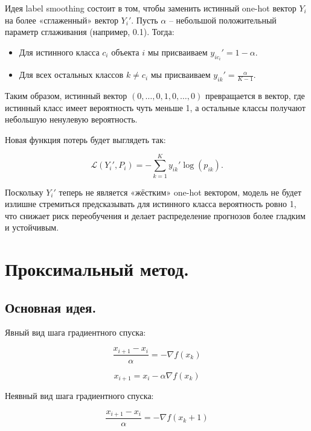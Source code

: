 \begin{solution}
Идея label smoothing состоит в том, чтобы заменить истинный one-hot вектор $Y_i$ на более «сглаженный» вектор $Y_i'$. Пусть $\alpha$ – небольшой положительный параметр сглаживания (например, 0.1). Тогда:

\begin{itemize}
    \item Для истинного класса $c_i$ объекта $i$ мы присваиваем $y_{ic_i}' = 1 - \alpha$.
    \item Для всех остальных классов $k \neq c_i$ мы присваиваем $y_{ik}' = \frac{\alpha}{K-1}$.
\end{itemize}

Таким образом, истинный вектор $(0,\dots,0,1,0,\dots,0)$ превращается в вектор, где истинный класс имеет вероятность чуть меньше 1, а остальные классы получают небольшую ненулевую вероятность.

Новая функция потерь будет выглядеть так:

$$
\mathcal{L}(Y_i', P_i) = -\sum_{k=1}^K y_{ik}' \log(p_{ik}).
$$

Поскольку $Y_i'$ теперь не является «жёстким» one-hot вектором, модель не будет излишне стремиться предсказывать для истинного класса вероятность ровно 1, что снижает риск переобучения и делает распределение прогнозов более гладким и устойчивым.
\end{solution}


\section*{Проксимальный метод.}

\subsection*{Основная идея.}

Явный вид шага градиентного спуска:

\begin{equation}
    \frac{x_{i+1}-x_i}\alpha=-\nabla f(x_k)
\end{equation}

\begin{equation}
    x_{i+1}=x_i-\alpha\nabla f(x_k)
\end{equation}

Неявный вид шага градиентного спуска:

\begin{equation}
    \frac{x_{i+1}-x_i}\alpha=-\nabla f(x_k+1)
\end{equation}

